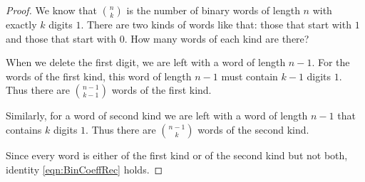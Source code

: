 

\setcounter{section}{3}
\setcounter{subsection}{3}
\setcounter{dfn}{6}

\begin{proof}
We know that $\binom{n}{k}$ is the number of binary words of length $n$ with exactly $k$ digits $1$.
There are two kinds of words like that: those that start with $1$ and those that start with $0$.
How many words of each kind are there?

When we delete the first digit, we are left with a word of length $n-1$.
For the words of the first kind, this word of length $n-1$ must contain $k-1$ digits $1$.
Thus there are $\binom{n-1}{k-1}$ words of the first kind.

Similarly, for a word of second kind we are left with a word of length $n-1$ that contains $k$ digits $1$.
Thus there are $\binom{n-1}k$ words of the second kind.

Since every word is either of the first kind or of the second kind but not both,
identity \eqref{eqn:BinCoeffRec} holds.
\end{proof}

